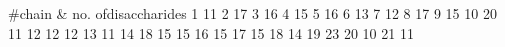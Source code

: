 #chain &  no. ofdisaccharides
1  11
2  17
3  16
4  15
5  16
6  13
7  12
8  17
9  15
10 20
11 12
12 12
13 11
14 18
15 15
16 15
17 15
18 14
19 23 
20 10 
21 11
